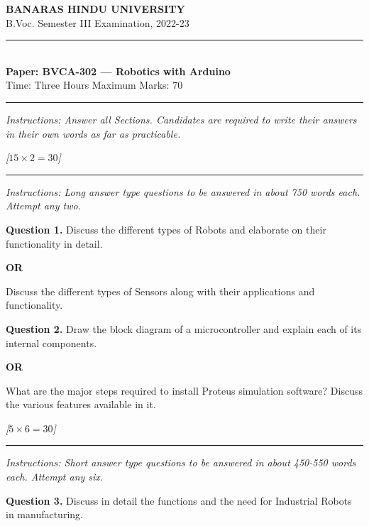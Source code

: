 \documentclass[11pt,a4paper]{article}
\newcommand{\pts}[1]{\hfill   \textit{[#1]}}
\begin{document}
\begin{center}
  {\large\bfseries BANARAS HINDU UNIVERSITY}\\[2pt]
  {
\normalsize B.Voc. Semester III Examination, 2022-23}\\[6pt]
  \rule{0.8\linewidth}{0.5pt}\\[6pt]
  {\large\bfseries Paper: BVCA-302 --- Robotics with Arduino}\\[4pt]
  {
\normalsize Time: Three Hours \hfill Maximum Marks: 70}
\end{center}

\rule{\linewidth}{0.4pt}

\smallskip



\noindent   \textit{Instructions: Answer all Sections. Candidates are required to write their answers in their own words as far as practicable.}

\bigskip

\bigskip


\pts{$15  \times 2 = 30$}
\rule{\linewidth}{0.4pt}\smallskip




\noindent   \textit{Instructions: Long answer type questions to be answered in about 750 words each. Attempt any two.}

\medskip


\noindent   \textbf{Question 1.} Discuss the different types of Robots and elaborate on their functionality in detail.
\centerline{   \textbf{OR}}
Discuss the different types of Sensors along with their applications and functionality.

\medskip


\noindent   \textbf{Question 2.} Draw the block diagram of a microcontroller and explain each of its internal components.
\centerline{   \textbf{OR}}
What are the major steps required to install Proteus simulation software? Discuss the various features available in it.

\bigskip


\pts{$5  \times 6 = 30$}
\rule{\linewidth}{0.4pt}\smallskip




\noindent   \textit{Instructions: Short answer type questions to be answered in about 450-550 words each. Attempt any six.}

\medskip


\noindent   \textbf{Question 3.} Discuss in detail the functions and the need for Industrial Robots in manufacturing.
\end{document}
